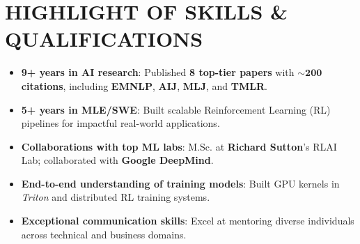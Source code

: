 \section{HIGHLIGHT OF SKILLS \& QUALIFICATIONS}
\begin{itemize}
    \item \textbf{9+ years in AI research}: Published \textbf{8 top-tier papers} with $\mathbf{\sim\!200}$ \textbf{citations}, including \textbf{EMNLP}, \textbf{AIJ}, \textbf{MLJ}, and \textbf{TMLR}.
    \item \textbf{5+ years in MLE/SWE}: Built scalable Reinforcement Learning (RL) pipelines for impactful real-world applications.
    \item \textbf{Collaborations with top ML labs}: M.Sc. at \textbf{Richard Sutton}'s RLAI Lab; collaborated with \textbf{Google DeepMind}.
    \item \textbf{End-to-end understanding of training models}: Built GPU kernels in \textit{Triton} and distributed RL training systems.
    \item \textbf{Exceptional communication skills}: Excel at mentoring diverse individuals across technical and business domains.
\end{itemize}
